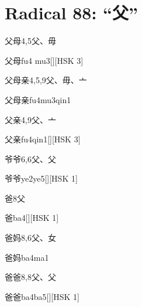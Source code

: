 
\section*{Radical 88: ``⽗''}

\begin{entry}{父母}{4,5}{⽗、⽏}
  \begin{phonetics}{父母}{fu4 mu3}[][HSK 3]
  \end{phonetics}
\end{entry}

\begin{entry}{父母亲}{4,5,9}{⽗、⽏、⼇}
  \begin{phonetics}{父母亲}{fu4mu3qin1}
  \end{phonetics}
\end{entry}

\begin{entry}{父亲}{4,9}{⽗、⼇}
  \begin{phonetics}{父亲}{fu4qin1}[][HSK 3]
  \end{phonetics}
\end{entry}

\begin{entry}{爷爷}{6,6}{⽗、⽗}
  \begin{phonetics}{爷爷}{ye2ye5}[][HSK 1]
  \end{phonetics}
\end{entry}

\begin{entry}{爸}{8}{⽗}
  \begin{phonetics}{爸}{ba4}[][HSK 1]
  \end{phonetics}
\end{entry}

\begin{entry}{爸妈}{8,6}{⽗、⼥}
  \begin{phonetics}{爸妈}{ba4ma1}
  \end{phonetics}
\end{entry}

\begin{entry}{爸爸}{8,8}{⽗、⽗}
  \begin{phonetics}{爸爸}{ba4ba5}[][HSK 1]
  \end{phonetics}
\end{entry}


